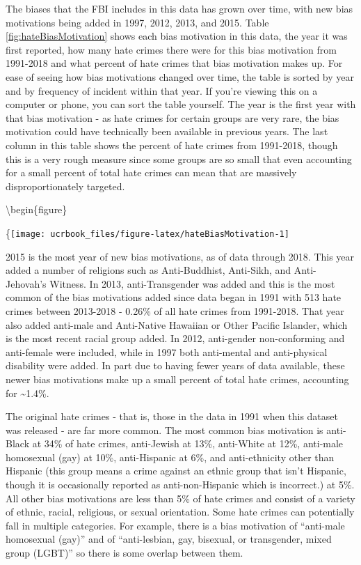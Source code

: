 \documentclass[
  12pt,
  openany]{book}
\begin{document}
The biases that the FBI includes in this data has grown over time, with new bias motivations being added in 1997, 2012, 2013, and 2015. Table \ref{fig:hateBiasMotivation} shows each bias motivation in this data, the year it was first reported, how many hate crimes there were for this bias motivation from 1991-2018 and what percent of hate crimes that bias motivation makes up. For ease of seeing how bias motivations changed over time, the table is sorted by year and by frequency of incident within that year. If you're viewing this on a computer or phone, you can sort the table yourself. The year is the first year with that bias motivation - as hate crimes for certain groups are very rare, the bias motivation could have technically been available in previous years. The last column in this table shows the percent of hate crimes from 1991-2018, though this is a very rough measure since some groups are so small that even accounting for a small percent of total hate crimes can mean that are massively disproportionately targeted.

\textbackslash begin\{figure\}

\{\centering \texttt{[image: ucrbook\_files/figure-latex/hateBiasMotivation-1]}

2015 is the most year of new bias motivations, as of data through 2018. This year added a number of religions such as Anti-Buddhist, Anti-Sikh, and Anti-Jehovah's Witness. In 2013, anti-Transgender was added and this is the most common of the bias motivations added since data began in 1991 with 513 hate crimes between 2013-2018 - 0.26\% of all hate crimes from 1991-2018. That year also added anti-male and Anti-Native Hawaiian or Other Pacific Islander, which is the most recent racial group added. In 2012, anti-gender non-conforming and anti-female were included, while in 1997 both anti-mental and anti-physical disability were added. In part due to having fewer years of data available, these newer bias motivations make up a small percent of total hate crimes, accounting for \textasciitilde1.4\%.

The original hate crimes - that is, those in the data in 1991 when this dataset was released - are far more common. The most common bias motivation is anti-Black at 34\% of hate crimes, anti-Jewish at 13\%, anti-White at 12\%, anti-male homosexual (gay) at 10\%, anti-Hispanic at 6\%, and anti-ethnicity other than Hispanic (this group means a crime against an ethnic group that isn't Hispanic, though it is occasionally reported as anti-non-Hispanic which is incorrect.) at 5\%. All other bias motivations are less than 5\% of hate crimes and consist of a variety of ethnic, racial, religious, or sexual orientation. Some hate crimes can potentially fall in multiple categories. For example, there is a bias motivation of ``anti-male homosexual (gay)'' and of ``anti-lesbian, gay, bisexual, or transgender, mixed group (LGBT)'' so there is some overlap between them.
\end{document}
